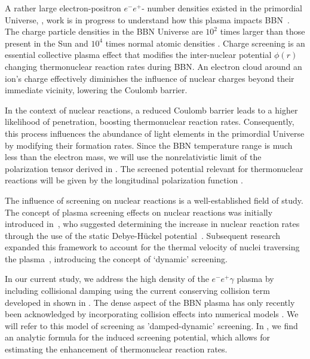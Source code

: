 A rather large electron-positron $e^-e^+$- number densities existed in the primordial Universe, , work is in progress to understand how this plasma impacts BBN~\cite{Wang:2010px,Hwang:2021kno,Rafelski:2023emw}. The charge particle densities in the BBN Universe are $10^2$ times larger than those present in the Sun \cite{Bahcall:2001smc} and $10^4$ times normal atomic densities \cite{Grayson:2023flr}. Charge screening is an essential collective plasma effect that modifies the inter-nuclear potential $\phi(r)$ changing thermonuclear reaction rates during BBN. An electron cloud around an ion's charge effectively diminishes the influence of nuclear charges beyond their immediate vicinity, lowering the Coulomb barrier. 

In the context of nuclear reactions, a reduced Coulomb barrier leads to a higher likelihood of penetration, boosting thermonuclear reaction rates. Consequently, this process influences the abundance of light elements in the primordial Universe by modifying their formation rates. Since the BBN temperature range is much less than the electron mass, we will use the nonrelativistic limit of the polarization tensor derived in . The screened potential relevant for thermonuclear reactions will be given by the longitudinal polarization function .

The influence of screening on nuclear reactions is a well-established field of study. The concept of plasma screening effects on nuclear reactions was initially introduced in~\cite{Salpeter:1954nc}, who suggested determining the increase in nuclear reaction rates through the use of the static Debye-H{\"u}ckel potential~\cite{Debye_1923a,Debye_1923b,Salpeter:1969apj,Famiano:2016hhs}. Subsequent research expanded this framework to account for the thermal velocity of nuclei traversing the plasma~\cite{Hwang:2021kno,Carraro:1988apj,Gruzinov:1997as,Opher:1999jh,Yao:2016cjs}, introducing the concept of `dynamic' screening. 

In our current study, we address the high density of the $e^-e^+\gamma$ plasma by including collisional damping using the current conserving collision term developed in \cite{Formanek:2021blc} shown in . The dense aspect of the BBN plasma has only recently been acknowledged by incorporating collision effects into numerical models \cite{Sasankan:2019oee,Kedia:2020xdc}. We will refer to this model of screening as 'damped-dynamic' screening. In \cite{Grayson:2023flr}, we find an analytic formula for the induced screening potential, which allows for estimating the enhancement of thermonuclear reaction rates.

